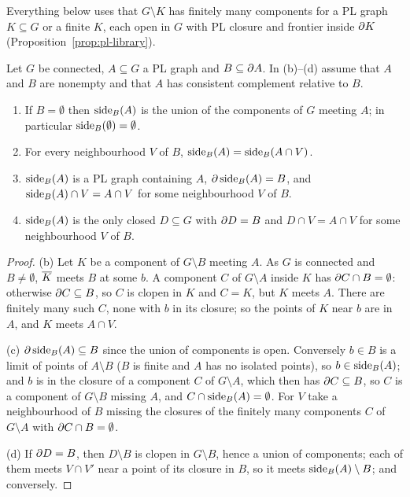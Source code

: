
Everything below uses that $G\setminus K$ has finitely many components for a PL graph $K\subseteq G$ or a finite $K$, each open in $G$ with PL closure and
frontier inside $\partial K$ (Proposition~\ref{prop:pl-library}).


\begin{proposition}\label{prop:sides-char}
Let $G$ be connected, $A\subseteq G$ a PL graph and $B\subseteq\partial A$. In (b)--(d) assume that $A$ and $B$ are nonempty and that $A$ has consistent complement relative to $B$.
\begin{enumerate}[label=(\alph*)]
\item If $B=\emptyset$ then $\operatorname{side}_B(A)$ is the union of the components of $G$ meeting $A$; in particular $\operatorname{side}_B(\emptyset)=\emptyset$.
\item For every neighbourhood $V$ of $B$, $\operatorname{side}_B(A)=\operatorname{side}_B(A\cap V)$.
\item $\operatorname{side}_B(A)$ is a PL graph containing $A$, $\partial\operatorname{side}_B(A)=B$, and $\operatorname{side}_B(A)\cap V=A\cap V$ for some neighbourhood $V$ of $B$.
\item $\operatorname{side}_B(A)$ is the only closed $D\subseteq G$ with $\partial D=B$ and $D\cap V=A\cap V$ for some neighbourhood $V$ of $B$.
\end{enumerate}
\end{proposition}

\begin{proof}
(b) Let $K$ be a component of $G\setminus B$ meeting $A$. As $G$ is connected and $B\neq\emptyset$, $\overline{K}$ meets $B$ at some $b$. A component $C$ of $G\setminus A$ inside $K$
has $\partial C\cap B=\emptyset$: otherwise $\partial C\subseteq B$, so $C$ is clopen in $K$ and $C=K$, but $K$ meets $A$. There are finitely many such $C$, none with $b$ in its closure;
so the points of $K$ near $b$ are in $A$, and $K$ meets $A\cap V$.

(c) $\partial\operatorname{side}_B(A)\subseteq B$ since the union of components is open. Conversely $b\in B$ is a limit of points of $A\setminus B$ ($B$ is finite and $A$ has no isolated
points), so $b\in\operatorname{side}_B(A)$; and $b$ is in the closure of a component $C$ of $G\setminus A$, which then has $\partial C\subseteq B$, so $C$ is a component of $G\setminus B$
missing $A$, and $C\cap\operatorname{side}_B(A)=\emptyset$. For $V$ take a neighbourhood of $B$ missing the closures of the finitely many components $C$ of $G\setminus A$ with
$\partial C\cap B=\emptyset$.

(d) If $\partial D=B$, then $D\setminus B$ is clopen in $G\setminus B$, hence a union of components; each of them meets $V\cap V'$ near a point of its closure in $B$, so it
meets $\operatorname{side}_B(A)\setminus B$; and conversely.
\end{proof}

